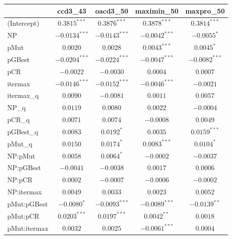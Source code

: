 \documentclass [PhD] {package/uclathes}
\begin{document}
\begin{table}
\begin{center}
\begin{tabular}{l c c c c}
\hline
 & ccd3\_43 & oacd3\_50 & maximin\_50 & maxpro\_50 \\
\hline
(Intercept)    & $0.3815^{***}$  & $0.3876^{***}$  & $0.3878^{***}$  & $0.3814^{***}$  \\
NP             & $-0.0134^{***}$ & $-0.0143^{***}$ & $-0.0042^{***}$ & $-0.0055^{*}$   \\
pMut           & $0.0020$        & $0.0028$        & $0.0043^{***}$  & $0.0045^{*}$    \\
pGBest         & $-0.0204^{***}$ & $-0.0224^{***}$ & $-0.0047^{***}$ & $-0.0082^{***}$ \\
pCR            & $-0.0022$       & $-0.0030$       & $0.0004$        & $0.0007$        \\
itermax        & $-0.0146^{***}$ & $-0.0152^{***}$ & $-0.0046^{***}$ & $-0.0021$       \\
itermax\_q     & $0.0090$        & $-0.0081$       & $0.0011$        & $0.0057$        \\
NP\_q          & $0.0119$        & $0.0080$        & $0.0022$        & $-0.0004$       \\
pCR\_q         & $0.0071$        & $0.0074$        & $-0.0008$       & $0.0049$        \\
pGBest\_q      & $0.0083$        & $0.0192^{*}$    & $0.0035$        & $0.0159^{***}$  \\
pMut\_q        & $0.0150$        & $0.0174^{*}$    & $0.0083^{***}$  & $0.0104^{*}$    \\
NP:pMut        & $0.0058$        & $0.0064^{*}$    & $-0.0002$       & $-0.0037$       \\
NP:pGBest      & $-0.0041$       & $-0.0038$       & $0.0017$        & $0.0006$        \\
NP:pCR         & $0.0002$        & $-0.0007$       & $-0.0006$       & $-0.0002$       \\
NP:itermax     & $0.0049$        & $0.0033$        & $0.0023$        & $0.0052$        \\
pMut:pGBest    & $-0.0080^{*}$   & $-0.0093^{***}$ & $-0.0089^{***}$ & $-0.0139^{**}$  \\
pMut:pCR       & $0.0203^{***}$  & $0.0197^{***}$  & $0.0042^{**}$   & $0.0018$        \\
pMut:itermax   & $0.0032$        & $0.0025$        & $-0.0061^{***}$ & $0.0004$        \\

\end{tabular}
\end{center}
\end{table}
\end{document}

